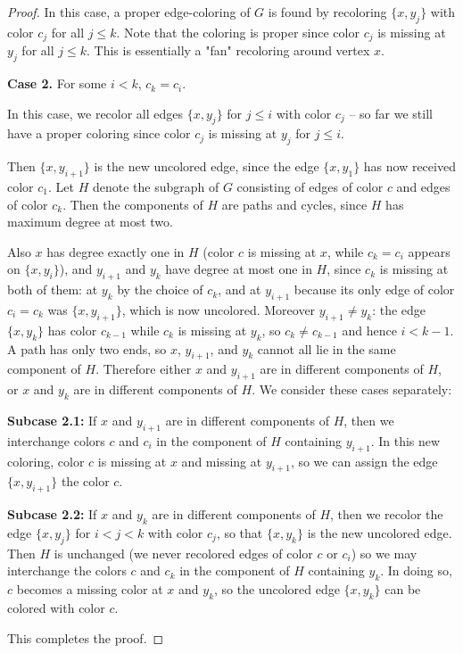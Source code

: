 \documentclass{article}
\theoremstyle{definition}
\begin{document}
\begin{proof}
In this case, a proper edge-coloring of $G$ is found by recoloring $\{x, y_j\}$ with color $c_j$ for all $j \leq k$. Note that the coloring is proper since color $c_j$ is missing at $y_j$ for all $j \leq k$. This is essentially a "fan" recoloring around vertex $x$.


\textbf{Case 2.} For some $i < k$, $c_k = c_i$. 

In this case, we recolor all edges $\{x, y_j\}$ for $j \leq i$ with color $c_j$ – so far we still have a proper coloring since color $c_j$ is missing at $y_j$ for $j \leq i$. 

Then $\{x, y_{i+1}\}$ is the new uncolored edge, since the edge $\{x, y_1\}$ has now received color $c_1$. Let $H$ denote the subgraph of $G$ consisting of edges of color $c$ and edges of color $c_k$. Then the components of $H$ are paths and cycles, since $H$ has maximum degree at most two. 

Also $x$ has degree exactly one in $H$ (color $c$ is missing at $x$, while $c_k = c_i$ appears on $\{x, y_i\}$), and $y_{i+1}$ and $y_k$ have degree at most one in $H$, since $c_k$ is missing at both of them: at $y_k$ by the choice of $c_k$, and at $y_{i+1}$ because its only edge of color $c_i = c_k$ was $\{x, y_{i+1}\}$, which is now uncolored. Moreover $y_{i+1} \neq y_k$: the edge $\{x, y_k\}$ has color $c_{k-1}$ while $c_k$ is missing at $y_k$, so $c_k \neq c_{k-1}$ and hence $i < k - 1$. A path has only two ends, so $x$, $y_{i+1}$, and $y_k$ cannot all lie in the same component of $H$. Therefore either $x$ and $y_{i+1}$ are in different components of $H$, or $x$ and $y_k$ are in different components of $H$. We consider these cases separately:

\textbf{Subcase 2.1:} If $x$ and $y_{i+1}$ are in different components of $H$, then we interchange colors $c$ and $c_i$ in the component of $H$ containing $y_{i+1}$. In this new coloring, color $c$ is missing at $x$ and missing at $y_{i+1}$, so we can assign the edge $\{x, y_{i+1}\}$ the color $c$.

\textbf{Subcase 2.2:} If $x$ and $y_k$ are in different components of $H$, then we recolor the edge $\{x, y_j\}$ for $i < j < k$ with color $c_j$, so that $\{x, y_k\}$ is the new uncolored edge. Then $H$ is unchanged (we never recolored edges of color $c$ or $c_i$) so we may interchange the colors $c$ and $c_k$ in the component of $H$ containing $y_k$. In doing so, $c$ becomes a missing color at $x$ and $y_k$, so the uncolored edge $\{x, y_k\}$ can be colored with color $c$.

This completes the proof.
\end{proof}
\end{document}
